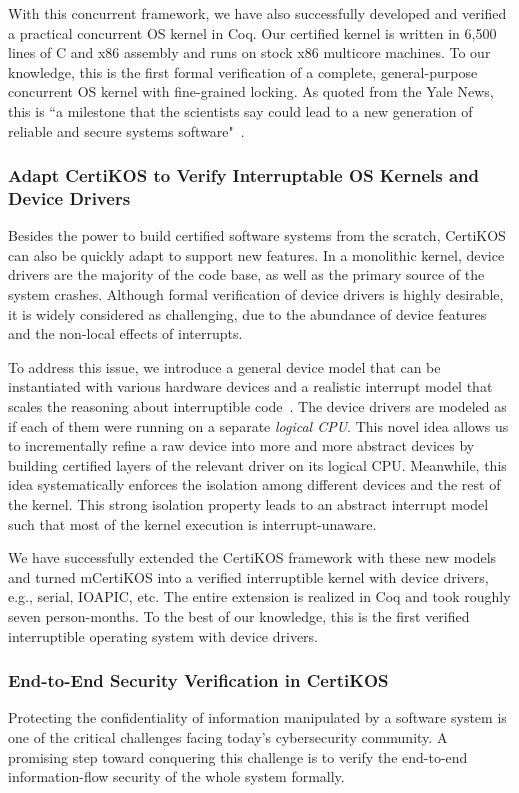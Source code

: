 \documentclass[a4paper, 10pt]{article}
\begin{document}
\begin{small}
 
With this concurrent framework,
we have also successfully developed and verified a practical concurrent OS
kernel in Coq. Our certified kernel is written in 6,500 lines of
C and x86 assembly and runs on stock x86 multicore
machines. To our knowledge, this is the first
formal verification of a complete, general-purpose
concurrent OS kernel with fine-grained locking.
As quoted from the Yale News, this is ``a milestone that the scientists say could lead to a new generation of reliable and secure systems software"~\cite{news}.

\subsubsection*{\small Adapt CertiKOS to Verify Interruptable OS Kernels and Device Drivers}
Besides the power to build certified software systems from the scratch, CertiKOS can also be quickly adapt to support new features.
In a monolithic kernel,
device drivers are the majority of the code base, as well as the primary source of the system crashes.
Although formal verification of device drivers is highly desirable, it is widely considered as challenging, due to the abundance of device features
and the non-local effects of interrupts.

To address this issue, we introduce
a general device model that can be
instantiated with various hardware devices and a realistic
interrupt model that scales the reasoning
about interruptible code~\cite{pldi16-device}. 
The device drivers are modeled
as if each of them were running on a  separate \emph{logical CPU}. This novel idea allows us to
incrementally refine a raw
device into more and more abstract devices
by building certified layers of the relevant driver on its logical CPU.
Meanwhile, this idea systematically enforces
the isolation among different devices and the
rest of the kernel. This strong isolation property 
leads to an abstract interrupt model such that
most of the kernel execution is interrupt-unaware.

We have successfully extended the CertiKOS framework with these new models
and turned mCertiKOS
into a verified interruptible kernel with device
drivers, e.g., serial, IOAPIC, etc. 
The entire extension is realized in Coq and took roughly seven person-months.
To the best of our knowledge, this is the first verified
interruptible operating system with device drivers.

\subsubsection*{\small End-to-End Security Verification in CertiKOS}
Protecting the confidentiality of information manipulated by
a software system is one of the critical challenges
facing today's cybersecurity community. A promising step
toward conquering this challenge is to  verify  the
end-to-end information-flow
security of the whole system formally. 


\end{small}
\end{document}
